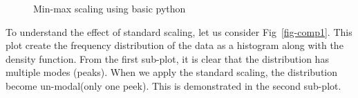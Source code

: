 \documentclass[
  letterpaper,
  DIV=11,
  numbers=noendperiod]{scrreprt}
\theoremstyle{plain}
\theoremstyle{definition}
\theoremstyle{remark}
\begin{document}
\begin{figure}[H]


\caption{\label{fig-minmax}Min-max scaling using basic python}

\end{figure}%

To understand the effect of standard scaling, let us consider
Fig~\ref{fig-comp1}. This plot create the frequency distribution of the
data as a histogram along with the density function. From the first
sub-plot, it is clear that the distribution has multiple modes (peaks).
When we apply the standard scaling, the distribution become
un-modal(only one peek). This is demonstrated in the second sub-plot.
\end{document}
